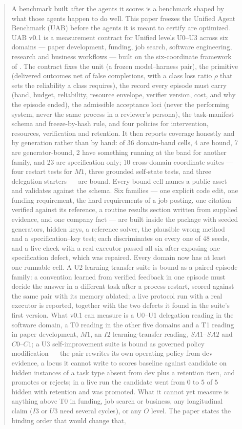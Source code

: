 \documentclass[11pt]{article}
\theoremstyle{definition}
\begin{document}
\begin{abstract}
A benchmark built after the agents it scores is a benchmark shaped by what those agents happen to do well. This paper freezes the Unified Agent Benchmark (UAB) before the agents it is meant to certify are optimized. UAB v0.1 is a measurement contract for Unified levels U0--U3 across six domains --- paper development, funding, job search, software engineering, research and business workflows --- built on the six-coordinate framework of \citet{yang2026unified}. The contract fixes the unit (a frozen model--harness pair), the primitive (delivered outcomes net of false completions, with a class loss ratio $\rho$ that sets the reliability a class requires), the record every episode must carry (band, budget, reliability, resource envelope, verifier version, cost, and why the episode ended), the admissible acceptance loci (never the performing system, never the same process in a reviewer's persona), the task-manifest schema and freeze-by-hash rule, and four policies for intervention, resources, verification and retention. It then reports coverage honestly and by generation rather than by hand: of 36 domain-band cells, 4 are bound, 7 are generator-bound, 2 have something running at the band for another family, and 23 are specification only; 10 cross-domain coordinate suites --- four restart tests for $M1$, three grounded self-state tests, and three delegation starters --- are bound. Every bound cell names a public asset and validates against the schema. Six families --- one explicit code edit, one funding requirement, the hard requirements of a job posting, one citation verified against its reference, a routine results section written from supplied evidence, and one company fact --- are built inside the package with seeded generators, hidden keys, a reference solver, the plausible wrong method and a specification--key test; each discriminates on every one of 48 seeds, and a live check with a real executor passed all six after exposing one specification defect, which was repaired. Every domain now has at least one runnable cell. A U2 learning-transfer suite is bound as a paired-episode family: a convention learned from verified feedback in one episode must decide the answer in a different task after a process restart, scored against the same pair with its memory ablated; a live protocol run with a real executor is reported, together with the two defects it found in the suite's first version. What v0.1 can measure is a U0--U1 delegation reading in the software domain, a T0 reading in the other five domains and a T1 reading in paper development, $M1$, an $I2$ learning-transfer reading, $SA1$--$SA2$ and $C0$--$C1$; a U3 self-improvement suite is bound as governed policy modification --- the pair rewrites its own operating policy from dev evidence, a locus it cannot write to scores baseline against candidate on hidden instances of a task type absent from dev plus a retention item, and promotes or rejects; in a live run the candidate went from 0 to 5 of 5 hidden with retention and was promoted. What it cannot yet measure is anything above T0 in funding, job search or business, any longitudinal claim ($I3$ or $U3$ need several cycles), or any $O$ level. The paper states the binding order that would change that, 
\end{abstract}
\end{document}
